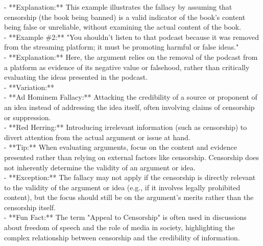 \documentclass[a4paper,12pt,single,pdftex]{scrbook}
\begin{document}
    
      - **Explanation:** This example illustrates the fallacy by assuming that censorship (the book being banned) is a valid indicator of the book’s content being false or unreliable, without examining the actual content of the book.
    \\

    
      - **Example \#2:** "You shouldn’t listen to that podcast because it was removed from the streaming platform; it must be promoting harmful or false ideas."
    \\

    
      - **Explanation:** Here, the argument relies on the removal of the podcast from a platform as evidence of its negative value or falsehood, rather than critically evaluating the ideas presented in the podcast.
    \\

    
      - **Variation:**
    \\

    
        - **Ad Hominem Fallacy:** Attacking the credibility of a source or proponent of an idea instead of addressing the idea itself, often involving claims of censorship or suppression.
    \\

    
        - **Red Herring:** Introducing irrelevant information (such as censorship) to divert attention from the actual argument or issue at hand.
    \\

    
      - **Tip:** When evaluating arguments, focus on the content and evidence presented rather than relying on external factors like censorship. Censorship does not inherently determine the validity of an argument or idea.
    \\

    
      - **Exception:** The fallacy may not apply if the censorship is directly relevant to the validity of the argument or idea (e.g., if it involves legally prohibited content), but the focus should still be on the argument's merits rather than the censorship itself.
    \\

    
      - **Fun Fact:** The term "Appeal to Censorship" is often used in discussions about freedom of speech and the role of media in society, highlighting the complex relationship between censorship and the credibility of information.
    \\
\end{document}
